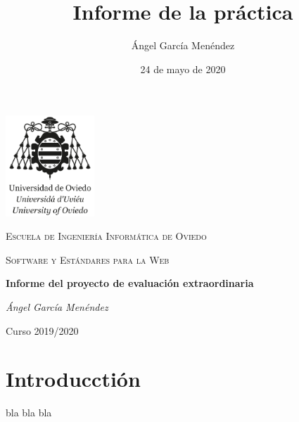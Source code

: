 \documentclass[11pt]{article}
\title{Informe de la práctica}
\author{Ángel García Menéndez}
\date{24 de mayo de 2020}
\begin{document}
        \begin{titlepage}
            \centering
            \includegraphics[width=0.25\textwidth]{logo}\par\vspace{1cm}
            {\scshape\LARGE Escuela de Ingeniería Informática de Oviedo\par}
            \vspace{1cm}
            {\scshape\Large Software y Estándares para la Web\par}
            \vspace{1.5cm}
            {\Huge\bfseries Informe del proyecto de evaluación extraordinaria\par}
            \vspace{2cm}
            {\Large\itshape Ángel García Menéndez\par}
            \vfill

            {\large Curso 2019/2020\par}
        \end{titlepage}

        \tableofcontents
        \newpage
        \section{Introducctión}\label{intro}
        bla bla bla

        
\end{document}
